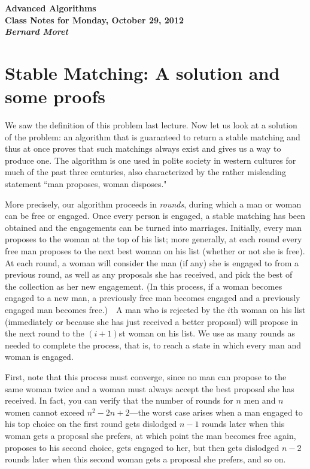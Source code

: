 \documentclass[11pt]{article}
\begin{document}
\begin{center}
  \LARGE\bf Advanced Algorithms\\

  \Large\sf
  Class Notes for Monday, October 29, 2012\\

  \it
  Bernard Moret
\end{center}

\bigskip


\section{Stable Matching: A solution and some proofs}
We saw the definition of this problem last lecture.  Now let us look
at a solution of the problem: an algorithm that is guaranteed
to return a stable matching and thus at once proves that such matchings
always exist and gives us a way to produce one.
The algorithm is one used in polite society in western cultures for much
of the past three centuries, also characterized
by the rather misleading statement ``man proposes, woman disposes."

More precisely, our algorithm proceeds in \emph{rounds}, during which
a man or woman can be free or engaged.  Once every person is engaged, a
stable matching has been obtained and the engagements can be turned into
marriages.  Initially, every man proposes to the woman at the top of his
list; more generally, at each round every free man proposes to the next
best woman on his list (whether or not she is free).  At each round,
a woman will consider the man (if any) she is engaged to from a previous
round, as well as any proposals she has received, and pick the best of the
collection as her new engagement.  (In this process, if a woman becomes
engaged to a new man, a previously free man becomes engaged and a previously
engaged man becomes free.)\ \ A man who is rejected by the $i$th woman on
his list (immediately or because she has just received a better proposal)
will propose in the next round to the $(i+1)$st woman on his list.
We use as many rounds as needed to complete the process, that is, to reach
a state in which every man and woman is engaged.

First, note that this process must converge, since no man can propose to
the same woman twice and a woman must always accept the best proposal she
has received.  In fact, you can verify that the number of rounds for $n$
men and $n$ women cannot exceed $n^2-2n+2$---the worst case arises when
a man engaged to his top choice on the first round gets dislodged $n-1$ rounds
later when this woman gets a proposal she prefers, at which point the man
becomes free again, proposes to his second choice, gets engaged to her, but
then gets dislodged $n-2$ rounds later when this second woman gets a proposal
she prefers, and so on.
\end{document}
